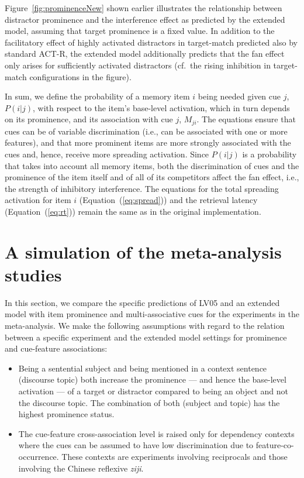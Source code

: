 \documentclass{cambridge7A}\usepackage[]{graphicx}\usepackage[]{color}
\begin{document}
Figure~\ref{fig:prominenceNew} shown earlier illustrates the relationship between distractor prominence and the interference effect as predicted by the extended model, assuming that target prominence is a fixed value. 
 In addition to the facilitatory effect of highly activated distractors in target-match predicted also by standard ACT-R, 
the extended model additionally predicts that the fan effect only arises for sufficiently activated distractors (cf.\ the rising inhibition in target-match configurations in the figure). 

In sum, we define the probability of a memory item $i$ being needed given cue $j$, $P(i|j)$, with respect to the item's base-level activation, which in turn depends on its prominence, and its association with cue $j$, $M_{ji}$. The equations ensure that cues can be of variable discrimination (i.e., can be associated with one or more features), and that more  prominent items are more strongly associated with the cues and, hence, receive more spreading activation. Since $P(i|j)$ is a probability that takes into account all memory items, both the discrimination of cues and the prominence of the item itself and of all of its competitors affect the fan effect, i.e., the strength of inhibitory interference. 
The equations for the total spreading activation for item $i$ (Equation~(\ref{eq:spread})) and the retrieval latency (Equation~(\ref{eq:rt})) remain the same as in the original implementation.

\section{A simulation of the meta-analysis studies}
\label{sec:sims}
In this section, we compare the specific predictions of LV05 and an extended model with item prominence and multi-associative cues for the experiments in the \cite{JaegerEngelmannVasishth2017} meta-analysis.
We make the following assumptions with regard to the relation between a specific experiment and the extended model settings for prominence and cue-feature associations:
\begin{itemize}
	\item Being a sentential subject and being mentioned in a context sentence  (discourse topic) both increase the prominence --- and hence the base-level activation --- of a target or distractor compared to being an object and not the discourse topic. The combination of both (subject and topic) has the highest prominence status.
	\item The cue-feature cross-association level is raised only for dependency contexts where the cues can be assumed to have low discrimination due to feature-co-occurrence. These contexts are experiments involving  reciprocals and those involving the  Chinese reflexive \textit{ziji}. 
\end{itemize}
\end{document}

